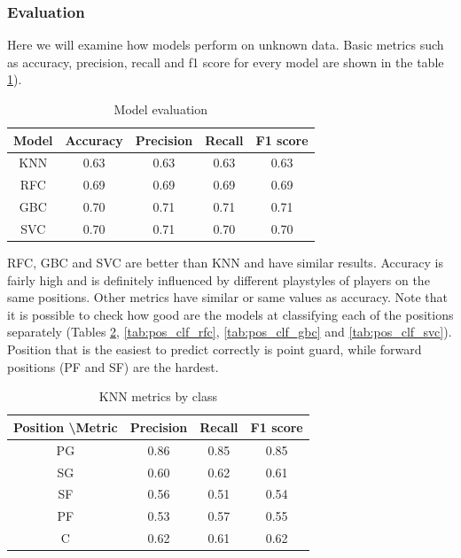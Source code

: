 \documentclass[a4paper]{article}
\begin{document}
\subsubsection{Evaluation}
\label{subsubsec:pos_clf_eval}

Here we will examine how models perform on unknown data. Basic metrics such as accuracy, precision, recall and f1 score for every model are shown in the table \ref{tab:pos_clf_models}).

\begin{table}[!h]
\begin{center}
\begin{tabular}{|c|c|c|c|c|} \hline
Model & Accuracy & Precision & Recall & F1 score \\ \hline
KNN & 0.63 & 0.63 & 0.63 & 0.63 \\ \hline
RFC & 0.69 & 0.69 & 0.69 & 0.69 \\ \hline
GBC & 0.70 & 0.71 & 0.71 & 0.71 \\ \hline
SVC & 0.70 & 0.71 & 0.70 & 0.70 \\ \hline
\end{tabular}
\caption{Model evaluation}
\label{tab:pos_clf_models}
\end{center}
\end{table}

RFC, GBC and SVC are better than KNN and have similar results. Accuracy is fairly high and is definitely influenced by different playstyles of players on the same positions. Other metrics have similar or same values as accuracy. Note that it is possible to check how good are the models at classifying each of the positions separately (Tables \ref{tab:pos_clf_knn}, \ref{tab:pos_clf_rfc}, \ref{tab:pos_clf_gbc} and \ref{tab:pos_clf_svc}). 
Position that is the easiest to predict correctly is point guard, while forward positions (PF and SF) are the hardest.

\begin{table}[!h]
\begin{center}
\begin{tabular}{|c|c|c|c|} \hline
Position \textbackslash Metric & Precision & Recall & F1 score \\ \hline
PG & 0.86 & 0.85 & 0.85 \\ \hline
SG & 0.60 & 0.62 & 0.61 \\ \hline
SF & 0.56 & 0.51 & 0.54 \\ \hline
PF & 0.53 & 0.57 & 0.55 \\ \hline
C & 0.62 & 0.61 & 0.62 \\ \hline
\end{tabular}
\caption{KNN metrics by class}
\label{tab:pos_clf_knn}
\end{center}
\end{table}
\end{document}

